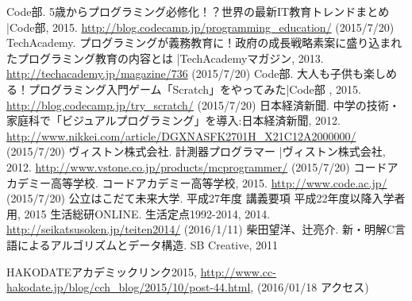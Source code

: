 \documentclass[openany,11pt,papersize]{jsbook}
\begin{document}

\begin{thebibliography}{13}
  Code部. 5歳からプログラミング必修化！？世界の最新IT教育トレンドまとめ |Code部,  2015. \url{http://blog.codecamp.jp/programming_education/} (2015/7/20)
  TechAcademy. プログラミングが義務教育に！政府の成長戦略素案に盛り込まれたプログラミング教育の内容とは |TechAcademyマガジン,  2013. \url{http://techacademy.jp/magazine/736} (2015/7/20)
   Code部. 大人も子供も楽しめる！プログラミング入門ゲーム「Scratch」をやってみた|Code部 ,  2015. \url{http://blog.codecamp.jp/try_scratch/} (2015/7/20)
  日本経済新聞. 中学の技術・家庭科で「ビジュアルプログラミング」を導入:日本経済新聞,  2012. \url{http://www.nikkei.com/article/DGXNASFK2701H_X21C12A2000000/} (2015/7/20)
  ヴィストン株式会社. 計測器プログラマー |ヴィストン株式会社,  2012. \url{http://www.vstone.co.jp/products/mcprogrammer/} (2015/7/20)
   コードアカデミー高等学校. コードアカデミー高等学校,  2015. \url{http://www.code.ac.jp/} (2015/7/20)
 公立はこだて未来大学. 平成27年度 講義要項 平成22年度以降入学者用,  2015
   生活総研ONLINE. 生活定点1992-2014,  2014. \url{http://seikatsusoken.jp/teiten2014/} (2016/1/11)
   柴田望洋、辻亮介. 新・明解C言語によるアルゴリズムとデータ構造. SB Creative, 2011

 HAKODATEアカデミックリンク2015, \url{http://www.cc-hakodate.jp/blog/cch_blog/2015/10/post-44.html}, (2016/01/18 アクセス)

\end{thebibliography}
\end{document}
